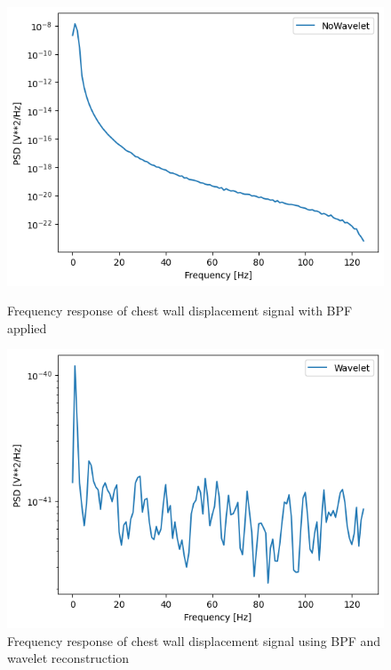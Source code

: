 \documentclass[dvipdfmx]{article}
\begin{document}
\begin{figure}[htbp]
    \begin{minipage}[c]{0.5\hsize}
      \centering
      \includegraphics[width=\linewidth]{./img/BPF_welch.png}
      \caption{Frequency response of chest wall displacement signal with BPF applied}
    \end{minipage}
    \begin{minipage}[c]{0.5\hsize}
      \centering
      \includegraphics[width=\linewidth]{./img/BPF_wavelet_welch.png}
      \caption{Frequency response of chest wall displacement signal using BPF and wavelet reconstruction}
    \end{minipage}
\end{figure}
\end{document}
